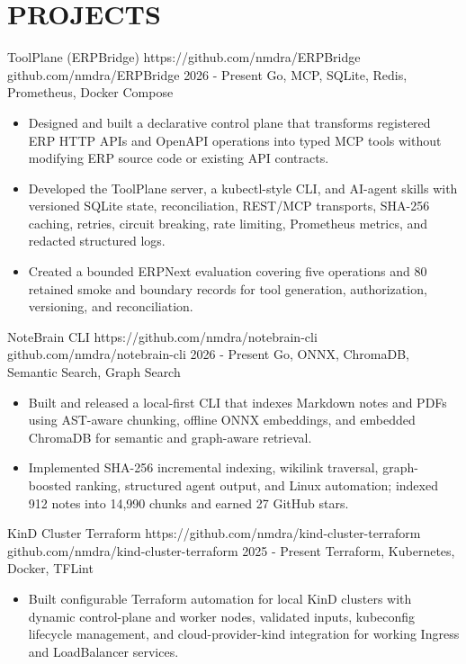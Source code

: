 \section{PROJECTS}

\projectentry
  {ToolPlane (ERPBridge)}
  {https://github.com/nmdra/ERPBridge}
  {github.com/nmdra/ERPBridge}
  {2026 - Present}
  {Go, MCP, SQLite, Redis, Prometheus, Docker Compose}

\begin{itemize}
  \item Designed and built a declarative control plane that transforms registered ERP HTTP APIs and OpenAPI operations into typed MCP tools without modifying ERP source code or existing API contracts.
  \item Developed the ToolPlane server, a kubectl-style CLI, and AI-agent skills with versioned SQLite state, reconciliation, REST/MCP transports, SHA-256 caching, retries, circuit breaking, rate limiting, Prometheus metrics, and redacted structured logs.
  \item Created a bounded ERPNext evaluation covering five operations and 80 retained smoke and boundary records for tool generation, authorization, versioning, and reconciliation.
\end{itemize}

\projectentry
  {NoteBrain CLI}
  {https://github.com/nmdra/notebrain-cli}
  {github.com/nmdra/notebrain-cli}
  {2026 - Present}
  {Go, ONNX, ChromaDB, Semantic Search, Graph Search}

\begin{itemize}
  \item Built and released a local-first CLI that indexes Markdown notes and PDFs using AST-aware chunking, offline ONNX embeddings, and embedded ChromaDB for semantic and graph-aware retrieval.
  \item Implemented SHA-256 incremental indexing, wikilink traversal, graph-boosted ranking, structured agent output, and Linux automation; indexed 912 notes into 14,990 chunks and earned 27 GitHub stars.
\end{itemize}

\projectentry
  {KinD Cluster Terraform}
  {https://github.com/nmdra/kind-cluster-terraform}
  {github.com/nmdra/kind-cluster-terraform}
  {2025 - Present}
  {Terraform, Kubernetes, Docker, TFLint}

\begin{itemize}
  \item Built configurable Terraform automation for local KinD clusters with dynamic control-plane and worker nodes, validated inputs, kubeconfig lifecycle management, and cloud-provider-kind integration for working Ingress and LoadBalancer services.
\end{itemize}

